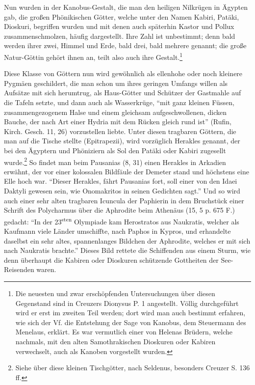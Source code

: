 \documentclass[a4paper, 11pt, oneside, polutonikogreek, german]{article}
\begin{document}
Nun wurden in der Kanobus-Gestalt, die man den heiligen Nilkrügen in Ägypten gab, die großen Phönikischen Götter, welche unter den Namen Kabiri, Patäki, Dioskuri, begriffen wurden und mit denen auch späterhin Kastor und Pollux zusammenschmolzen, häufig dargestellt. Ihre Zahl ist unbestimmt; denn bald werden ihrer zwei, Himmel und Erde, bald drei, bald mehrere genannt; die große Natur-Göttin gehört ihnen an, teilt also auch ihre Gestalt.\footnote{Die neuesten und zwar erschöpfenden Untersuchungen über diesen Gegenstand sind in Creuzers Dionysus P. 1 angestellt. Völlig durchgeführt wird er erst im zweiten Teil werden; dort wird man auch bestimmt erfahren, wie sich der Vf. die Entstehung der Sage von Kanobus, dem Steuermann des Menelaus, erklärt. Es war vermutlich einer von Helenas Brüdern, welche nachmals, mit den alten Samothrakischen Dioskuren oder Kabiren verwechselt, auch als Kanoben vorgestellt wurden.}

Diese Klasse von Göttern nun wird gewöhnlich als ellenhohe oder noch kleinere Pygmäen geschildert, die man schon um ihres geringen Umfangs willen als Aufsätze mit sich herumtrug, als Haus-Götter und Schützer der Gastmahle auf die Tafeln setzte, und dann auch als Wasserkrüge, "`mit ganz kleinen Füssen, zusammengezogenem Halse und einem gleichsam aufgeschwollenen, dicken Bauche, der nach Art einer Hydria mit dem Rücken gleich rund ist"' (Rufin, Kirch. Gesch. 11, 26) vorzustellen liebte. Unter diesen tragbaren Göttern, die man auf die Tische stellte (Epitrapezii), wird vorzüglich Herakles genannt, der bei den Ägyptern und Phöniziern als Sol den Patäki oder Kabiri zugesellt wurde.\footnote{Siehe über diese kleinen Tischgötter, nach Seldenus, besonders Creuzer S. 136 ff.} So findet man beim Pausanias (8, 31) einen Herakles in Arkadien erwähnt, der vor einer kolossalen Bildfäule der Demeter stand und höchstens eine Elle hoch war. "`Dieser Herakles, fährt Pausanias fort, soll einer von den Idaei Daktyli gewesen sein, wie Onomakritos in seinen Gedichten sagt."' Und so wird auch einer sehr alten tragbaren Icuncula der Paphierin in dem Bruchstück einer Schrift des Polycharmus über die Aphrodite beim Athenäus (15, 5 p. 675 F.) gedacht: "`In der 23\textsuperscript{sten} Olympiade kam Herostratos aus Naukratis, welcher als Kaufmann viele Länder umschiffte, nach Paphos in Kypros, und erhandelte daselbst ein sehr altes, spannenlanges Bildchen der Aphrodite, welches er mit sich nach Naukratis brachte."' Dieses Bild rettete die Schiffenden aus einem Sturm, wie denn überhaupt die Kabiren oder Dioskuren schützende Gottheiten der See-Reisenden waren.
\end{document}
